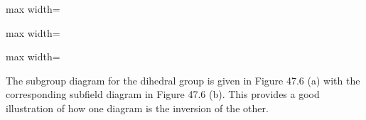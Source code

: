 \documentclass[11pt,oneside]{article}
\begin{document}
\begin{BookBody}
\begin{center}\begin{adjustbox}{max width=\linewidth}\end{adjustbox}\end{center}

\begin{center}\begin{adjustbox}{max width=\linewidth}\end{adjustbox}\end{center}

\begin{center}\begin{adjustbox}{max width=\linewidth}\end{adjustbox}\end{center}

The subgroup diagram for the dihedral group is given in Figure 47.6 (a) with the corresponding subfield diagram in Figure 47.6 (b). This provides a good illustration of how one diagram is the inversion of the other.


\end{BookBody}
\end{document}
